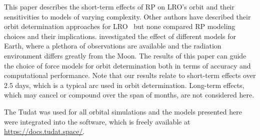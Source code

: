 This paper describes the short-term effects of \gls{RP} on \gls{LRO}'s orbit and their sensitivities to models of varying complexity. Other authors have described their orbit determination approaches for \gls{LRO}~\cite{Mazarico2011,Mazarico2018,Nicholson2010,Smith2008,Slojkowski2014,Slojkowski2015,Bauer2016,Maier2016} but none compared \gls{RP} modeling choices and their implications. \citeauthor{Vielberg2020} investigated the effect of different models for Earth, where a plethora of observations are available and the radiation environment differs greatly from the Moon. The results of this paper can guide the choice of force models for orbit determination both in terms of accuracy and computational performance. Note that our results relate to short-term effects over 2.5 days, which is a typical arc used in orbit determination. Long-term effects, which may cancel or compound over the span of months, are not considered here.

The \gls{Tudat} was used for all orbital simulations and the models presented here were integrated into the software, which is freely available at \url{https://docs.tudat.space/}.
